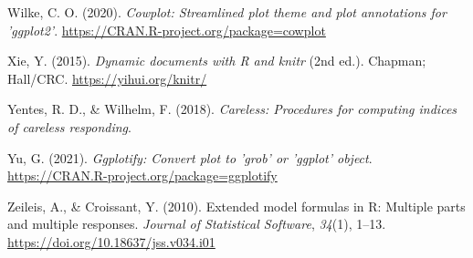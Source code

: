 \documentclass[
  english,
  man, noextraspace]{apa7}
\begin{document}
\begin{appendix}
\leavevmode\hypertarget{ref-R-cowplot}{}%
Wilke, C. O. (2020). \emph{Cowplot: Streamlined plot theme and plot
annotations for 'ggplot2'}.
\url{https://CRAN.R-project.org/package=cowplot}

\leavevmode\hypertarget{ref-R-knitr}{}%
Xie, Y. (2015). \emph{Dynamic documents with R and knitr} (2nd ed.).
Chapman; Hall/CRC. \url{https://yihui.org/knitr/}

\leavevmode\hypertarget{ref-R-careless}{}%
Yentes, R. D., \& Wilhelm, F. (2018). \emph{Careless: Procedures for
computing indices of careless responding}.

\leavevmode\hypertarget{ref-R-ggplotify}{}%
Yu, G. (2021). \emph{Ggplotify: Convert plot to 'grob' or 'ggplot'
object}. \url{https://CRAN.R-project.org/package=ggplotify}

\leavevmode\hypertarget{ref-R-Formula}{}%
Zeileis, A., \& Croissant, Y. (2010). Extended model formulas in R:
Multiple parts and multiple responses. \emph{Journal of Statistical
Software}, \emph{34}(1), 1--13.
\url{https://doi.org/10.18637/jss.v034.i01}

\endgroup
\end{appendix}
\end{document}
